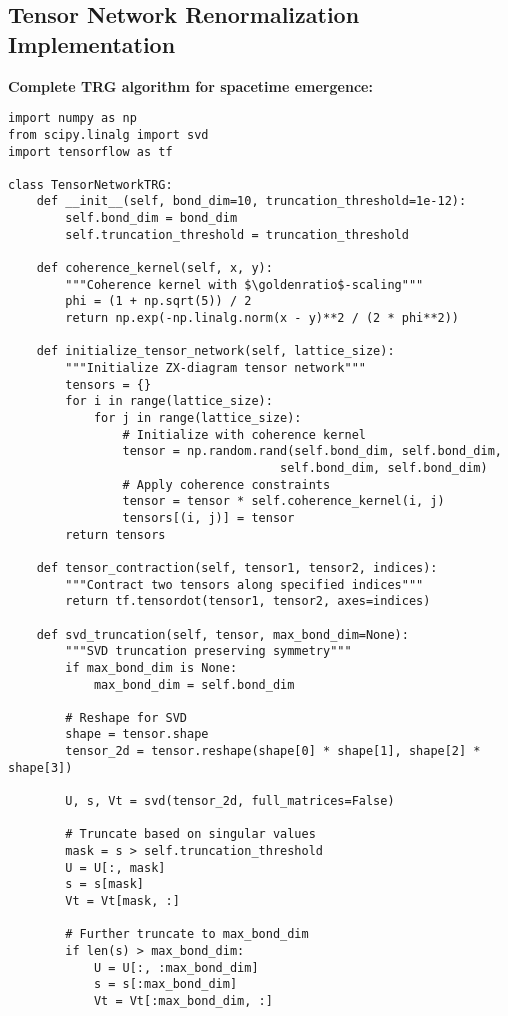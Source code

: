\documentclass[11pt]{article}
\theoremstyle{definition}
\newcommand{\goldenratio}{\phi}
\begin{document}
\subsection{Tensor Network Renormalization Implementation}

\textbf{Complete TRG algorithm for spacetime emergence:}

\begin{verbatim}
import numpy as np
from scipy.linalg import svd
import tensorflow as tf

class TensorNetworkTRG:
    def __init__(self, bond_dim=10, truncation_threshold=1e-12):
        self.bond_dim = bond_dim
        self.truncation_threshold = truncation_threshold
        
    def coherence_kernel(self, x, y):
        """Coherence kernel with $\goldenratio$-scaling"""
        phi = (1 + np.sqrt(5)) / 2
        return np.exp(-np.linalg.norm(x - y)**2 / (2 * phi**2))
    
    def initialize_tensor_network(self, lattice_size):
        """Initialize ZX-diagram tensor network"""
        tensors = {}
        for i in range(lattice_size):
            for j in range(lattice_size):
                # Initialize with coherence kernel
                tensor = np.random.rand(self.bond_dim, self.bond_dim, 
                                      self.bond_dim, self.bond_dim)
                # Apply coherence constraints
                tensor = tensor * self.coherence_kernel(i, j)
                tensors[(i, j)] = tensor
        return tensors
    
    def tensor_contraction(self, tensor1, tensor2, indices):
        """Contract two tensors along specified indices"""
        return tf.tensordot(tensor1, tensor2, axes=indices)
    
    def svd_truncation(self, tensor, max_bond_dim=None):
        """SVD truncation preserving symmetry"""
        if max_bond_dim is None:
            max_bond_dim = self.bond_dim
            
        # Reshape for SVD
        shape = tensor.shape
        tensor_2d = tensor.reshape(shape[0] * shape[1], shape[2] * shape[3])
        
        U, s, Vt = svd(tensor_2d, full_matrices=False)
        
        # Truncate based on singular values
        mask = s > self.truncation_threshold
        U = U[:, mask]
        s = s[mask]
        Vt = Vt[mask, :]
        
        # Further truncate to max_bond_dim
        if len(s) > max_bond_dim:
            U = U[:, :max_bond_dim]
            s = s[:max_bond_dim]
            Vt = Vt[:max_bond_dim, :]
        

\end{verbatim}
\end{document}
